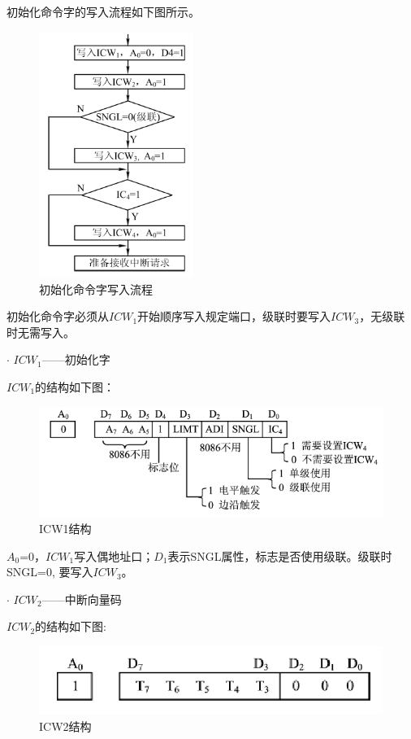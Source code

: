 \documentclass[UTF8,12pt]{ctexart}
\begin{document}
    初始化命令字的写入流程如下图所示。
    \begin{figure}[H]
        \centering
        \includegraphics[width=5cm]{images/初始化命令字.png}
        \caption{初始化命令字写入流程}
        \label{初始化命令字写入流程}
    \end{figure}
    
    初始化命令字必须从$ICW_1$开始顺序写入规定端口，级联时要写入$ICW_3$，无级联时无需写入。
    
    $\cdot$ $ICW_1$——初始化字
    
    $ICW_1$的结构如下图：
    \begin{figure}[H]
        \centering
        \includegraphics[width=12cm]{images/ICW1.png}
        \caption{ICW1结构}
        \label{ICW1}
    \end{figure}
    
    $A_0$=0，$ICW_1$写入偶地址口；$D_1$表示SNGL属性，标志是否使用级联。级联时SNGL=0, 要写入$ICW_3$。
    
    $\cdot$ $ICW_2$——中断向量码
    
    $ICW_2$的结构如下图:
    \begin{figure}[H]
        \centering
        \includegraphics[width=12cm]{images/ICW2.png}
        \caption{ICW2结构}
        \label{ICW2}
    \end{figure}
    
\end{document}
